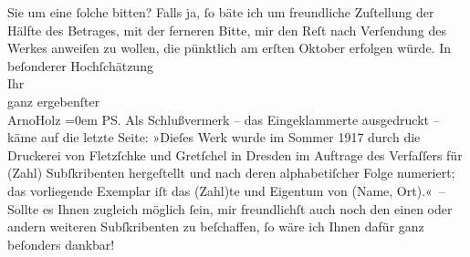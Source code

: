 \begin{ledgroupsized}[t]{13cm}
               Sie um eine ſolche bitten? Falls ja, ſo bäte ich um freundliche Zuſtellung der Hälfte
               des Betrages, mit der ferneren Bitte, mir den Reſt nach Verſendung des Werkes
               anweiſen zu wollen, die pünktlich am erſten Oktober erfolgen würde.\pend
           \pstart
           In beſonderer Hochſchätzung{\\[\baselineskip]}Ihr{\\[\baselineskip]}ganz ergebenſter{\\[\baselineskip]}\spacefill\mbox{ArnoHolz}\pend
           \leftskip=0em{}\pstart
           PS. Als Schlußvermerk – das Eingeklammerte ausgedruckt – käme auf die letzte
               Seite:\pend
           \pstart
           »Dieſes Werk wurde im Sommer 1917 durch die Druckerei von Fletzſchke und Gretſchel in Dresden im Auftrage des Verfaſſers für (Zahl) Subſkribenten
               hergeſtellt und nach deren alphabetiſcher Folge numeriert; das vorliegende Exemplar
               iſt das (Zahl)te und Eigentum von (Name, Ort).« –\pend
           \pstart
           Sollte es Ihnen zugleich möglich ſein, mir freundlichſt auch noch den einen oder
               andern weiteren Subſkribenten zu beſchaffen, ſo wäre ich Ihnen dafür ganz beſonders
               dankbar!\pend
           
         
         \endnumbering{}\end{ledgroupsized}  \newcommand{\dateiname}{L02255}\newcommand{\titel}{Arno Holz an Arthur Schnitzler, 11. 2. 1917}\newcommand{\editorInnen}{Martin Anton Müller und Gerd-Hermann Susen}
      